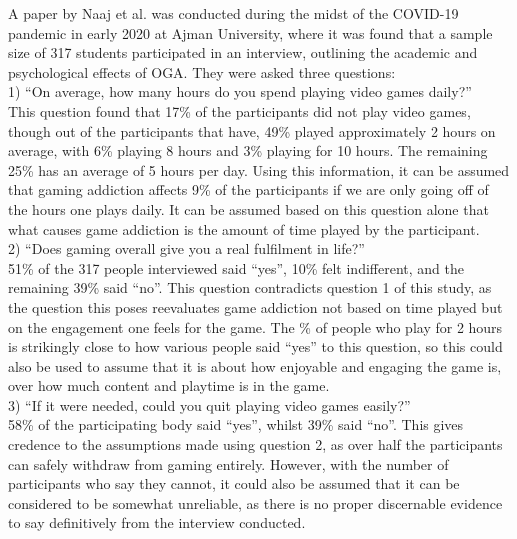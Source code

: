 \documentclass[conference]{IEEEtran}
\begin{document}
A paper by Naaj et al.\cite{Naaj2021} was conducted during the midst of the COVID-19 pandemic in early 2020 at Ajman University, where it was found that a sample size of 317 students participated in an interview, outlining the academic and psychological effects of OGA. They were asked three questions: \\

1) “On average, how many hours do you spend playing video games daily?”\\

This question found that 17\% of the participants did not play video games, though out of the participants that have, 49\% played approximately 2 hours on average, with 6\% playing 8 hours and 3\% playing for 10 hours. The remaining 25\% has an average of 5 hours per day. Using this information, it can be assumed that gaming addiction affects 9\% of the participants if we are only going off of the hours one plays daily. It can be assumed based on this question alone that what causes game addiction is the amount of time played by the participant.\\

2) “Does gaming overall give you a real fulfilment in life?”\\

51\% of the 317 people interviewed said “yes”, 10\% felt indifferent, and the remaining 39\% said “no”. This question contradicts question 1 of this study, as the question this poses reevaluates game addiction not based on time played but on the engagement one feels for the game. The \% of people who play for 2 hours is strikingly close to how various people said “yes” to this question, so this could also be used to assume that it is about how enjoyable and engaging the game is, over how much content and playtime is in the game.\\

3) “If it were needed, could you quit playing video games easily?”\\

58\% of the participating body said “yes”, whilst 39\% said “no”. This gives credence to the assumptions made using question 2, as over half the participants can safely withdraw from gaming entirely. However, with the number of participants who say they cannot, it could also be assumed that it can be considered to be somewhat unreliable, as there is no proper discernable evidence to say definitively from the interview conducted.\\
\end{document}
